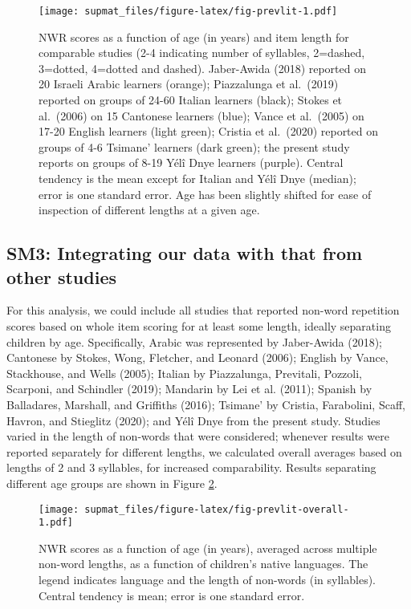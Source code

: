 \documentclass[
  american,
  ,doc,floatsintext]{apa6}
\begin{document}
\begin{figure}
\centering
\texttt{[image: supmat\_files/figure-latex/fig-prevlit-1.pdf]}
\caption{\label{fig:fig-prevlit}NWR scores as a function of age (in years) and item length for comparable studies (2-4 indicating number of syllables, 2=dashed, 3=dotted, 4=dotted and dashed). Jaber-Awida (2018) reported on 20 Israeli Arabic learners (orange); Piazzalunga et al.~(2019) reported on groups of 24-60 Italian learners (black); Stokes et al.~(2006) on 15 Cantonese learners (blue); Vance et al.~(2005) on 17-20 English learners (light green); Cristia et al.~(2020) reported on groups of 4-6 Tsimane' learners (dark green); the present study reports on groups of 8-19 Yélî Dnye learners (purple). Central tendency is the mean except for Italian and Yélî Dnye (median); error is one standard error. Age has been slightly shifted for ease of inspection of different lengths at a given age.}
\end{figure}

\hypertarget{sm3-integrating-our-data-with-that-from-other-studies}{%
\subsection{SM3: Integrating our data with that from other studies}\label{sm3-integrating-our-data-with-that-from-other-studies}}

For this analysis, we could include all studies that reported non-word repetition scores based on whole item scoring for at least some length, ideally separating children by age. Specifically, Arabic was represented by Jaber-Awida (2018); Cantonese by Stokes, Wong, Fletcher, and Leonard (2006); English by Vance, Stackhouse, and Wells (2005); Italian by Piazzalunga, Previtali, Pozzoli, Scarponi, and Schindler (2019); Mandarin by Lei et al. (2011); Spanish by Balladares, Marshall, and Griffiths (2016); Tsimane' by Cristia, Farabolini, Scaff, Havron, and Stieglitz (2020); and Yélî Dnye from the present study. Studies varied in the length of non-words that were considered; whenever results were reported separately for different lengths, we calculated overall averages based on lengths of 2 and 3 syllables, for increased comparability. Results separating different age groups are shown in Figure \ref{fig:fig-prevlit-overall}.

\begin{figure}
\centering
\texttt{[image: supmat\_files/figure-latex/fig-prevlit-overall-1.pdf]}
\caption{\label{fig:fig-prevlit-overall}NWR scores as a function of age (in years), averaged across multiple non-word lengths, as a function of children's native languages. The legend indicates language and the length of non-words (in syllables). Central tendency is mean; error is one standard error.}
\end{figure}
\end{document}
